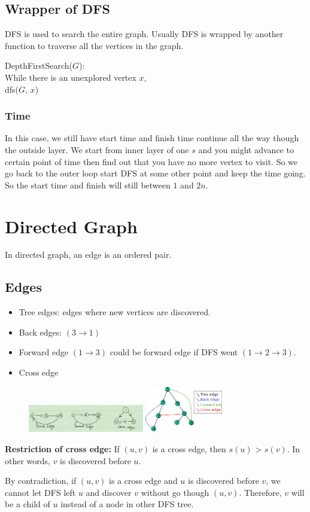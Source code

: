 \subsection{Wrapper of DFS}
DFS is used to search the entire graph. Usually DFS is wrapped by another 
function to traverse all the vertices in the graph.

DepthFirstSearch($G$):\\
\tab \tab While there is an unexplored vertex $x$,\\
\tab \tab \tab dfs($G$, $x$)

\subsubsection{Time}
In this case, we still have start time and finish time continue all the way 
though the outside layer. We start from inner layer of one $s$ and you might 
advance to certain point of time then find out that you have no more vertex to 
visit. So we go back to the outer loop start DFS at some other point and keep 
the time going. So the start time and finish will still between $1$ and $2n$.
\section{Directed Graph}
In directed graph, an edge is an ordered pair. 
\subsection{Edges}
\begin{itemize}
 \item Tree edges: edges where new vertices are discovered.
 \item Back edges: $(3 \rightarrow 1)$
 \item Forward edge $(1 \rightarrow 3)$ could be forward edge if DFS went $(1 
\rightarrow 2 \rightarrow 3)$.
 \item Cross edge
\end{itemize}

\begin{figure}[H]
\centering
\includegraphics[width=0.45\textwidth]{edges.png}
\includegraphics[width=0.3\textwidth]{edges-2.png}
\end{figure}
\begin{claim}
\textbf{Restriction of cross edge:} If $(u, v)$ is a cross edge, then 
$s(u)$ > $s(v)$. In other words, $v$ is discovered before $u$.
\end{claim}
\begin{claimproof}
By contradiction, if $(u, v)$ is a cross edge and $u$ is discovered before $v$, 
we cannot let DFS left $u$ and discover $v$ without go though $(u, v)$. 
Therefore, $v$ will be a child of $u$ instead of a node in other DFS tree.
\end{claimproof}
